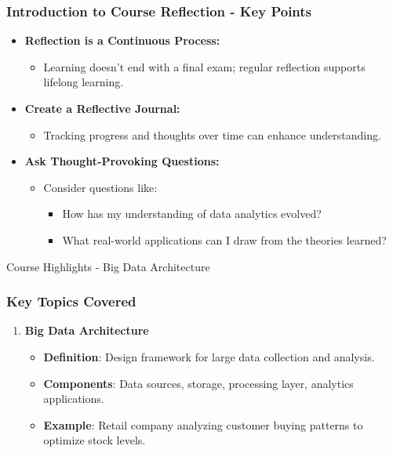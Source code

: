 \documentclass[aspectratio=169]{beamer}
\begin{document}
\begin{frame}[fragile]
    \frametitle{Introduction to Course Reflection - Key Points}
    \begin{itemize}
        \item \textbf{Reflection is a Continuous Process:}
        \begin{itemize}
            \item Learning doesn’t end with a final exam; regular reflection supports lifelong learning.
        \end{itemize}

        \item \textbf{Create a Reflective Journal:}
        \begin{itemize}
            \item Tracking progress and thoughts over time can enhance understanding.
        \end{itemize}

        \item \textbf{Ask Thought-Provoking Questions:}
        \begin{itemize}
            \item Consider questions like:
            \begin{itemize}
                \item How has my understanding of data analytics evolved?
                \item What real-world applications can I draw from the theories learned?
            \end{itemize}
        \end{itemize}
    \end{itemize}
\end{frame}

\begin{frame}[fragile]{Course Highlights - Big Data Architecture}
  \frametitle{Key Topics Covered}
  
  \begin{enumerate}
    \item \textbf{Big Data Architecture}
    \begin{itemize}
      \item \textbf{Definition}: Design framework for large data collection and analysis.
      \item \textbf{Components}: Data sources, storage, processing layer, analytics applications.
      \item \textbf{Example}: Retail company analyzing customer buying patterns to optimize stock levels.
    \end{itemize}
  \end{enumerate}
\end{frame}
\end{document}
